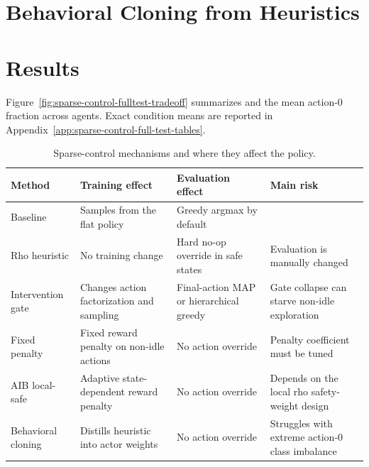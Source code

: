\section{Behavioral Cloning from Heuristics}
\label{subsec:sparse-control-bc}


\section{Results}
Figure~\ref{fig:sparse-control-fulltest-tradeoff} summarizes  and the
mean action-0 fraction across agents. Exact condition means are reported in
Appendix~\ref{app:sparse-control-full-test-tables}.

\begin{table}[htbp]
  \centering
  \small
  \caption{Sparse-control mechanisms and where they affect the policy.}
  \label{tab:sparse-control-mechanisms}
  \setlength{\tabcolsep}{3pt}
  \begin{tabular}{L{0.18\textwidth}L{0.30\textwidth}L{0.24\textwidth}L{0.18\textwidth}}
    \toprule
    Method & Training effect & Evaluation effect & Main risk \\
    \midrule
    Baseline & Samples from the flat policy & Greedy argmax by default &
     \\
    Rho heuristic & No training change & Hard no-op override in safe states &
    Evaluation is manually changed \\
    Intervention gate & Changes action factorization and sampling &
    Final-action MAP or hierarchical greedy & Gate collapse can starve non-idle exploration \\
    Fixed penalty & Fixed reward penalty on non-idle actions & No action override &
    Penalty coefficient must be tuned \\
    AIB local-safe & Adaptive state-dependent reward penalty & No action override &
    Depends on the local rho safety-weight design \\
    Behavioral cloning & Distills heuristic into actor weights & No action override &
    Struggles with extreme action-0 class imbalance \\
    \bottomrule
  \end{tabular}
\end{table}

